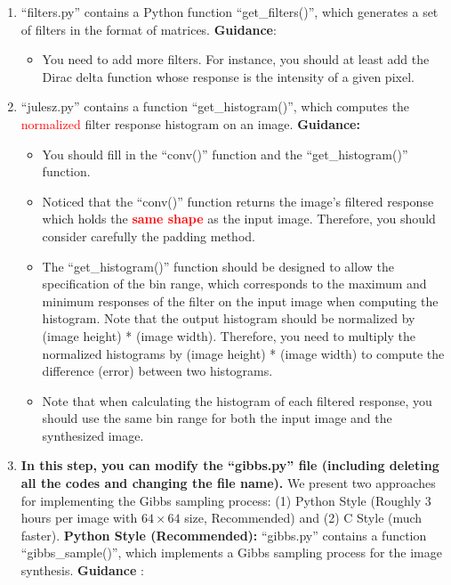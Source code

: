 \documentclass[11pt]{article}
\begin{document}
\begin{enumerate}
    \item ``filters.py'' contains a Python function ``get\_filters()'', which generates a set of filters in the format of matrices. 
    \textbf{Guidance}:
    \begin{itemize}
        \item You need to add more filters. For instance, you should at least add the Dirac delta function whose response is the intensity of a given pixel.\label{mark-A.}
    \end{itemize}
    \item  ``julesz.py'' contains a function ``get\_histogram()'', which computes the \textcolor{red}{normalized} filter response histogram on an image. 
    \textbf{Guidance:}  
    \begin{itemize}
        \item You should fill in the ``conv()'' function and the ``get\_histogram()'' function. 
        \item Noticed that the ``conv()'' function returns the image's filtered response which holds the \textbf{\textcolor{red}{same shape}} as the input image. Therefore, you should consider carefully the padding method.
        \item The ``get\_histogram()'' function should be designed to allow the specification of the bin range, which corresponds to the maximum and minimum responses of the filter on the input image when computing the histogram. Note that the output histogram should be normalized by (image height) * (image width). Therefore, you need to multiply the normalized histograms by (image height) * (image width) to compute the difference (error) between two histograms.
        \item Note that when calculating the histogram of each filtered response, you should use the same bin range for both the input image and the synthesized image.
    \end{itemize}
    \item \textbf{In this step, you can modify the ``gibbs.py'' file (including deleting all the codes and changing the file name).} We present two approaches for implementing the Gibbs sampling process: (1) Python Style (Roughly 3 hours per image with $64 \times 64$ size, Recommended) and (2) C Style (much faster).
    \textbf{Python Style (Recommended):}
    ``gibbs.py'' contains a function ``gibbs\_sample()'', which implements a Gibbs sampling process for the image synthesis. 
    \textbf{Guidance }:


\end{enumerate}
\end{document}
